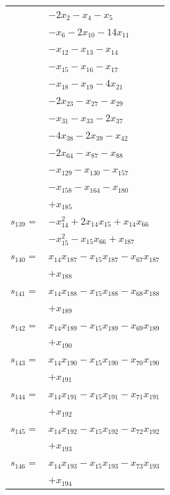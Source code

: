 \begin{longtable}{@{}r@{\;}l@{}}
 & \(\displaystyle -2x_{2} -x_{4} -x_{5}\) \\
 & \(\displaystyle -x_{6} -2x_{10} -14x_{11}\) \\
 & \(\displaystyle -x_{12} -x_{13} -x_{14}\) \\
 & \(\displaystyle -x_{15} -x_{16} -x_{17}\) \\
 & \(\displaystyle -x_{18} -x_{19} -4x_{21}\) \\
 & \(\displaystyle -2x_{23} -x_{27} -x_{29}\) \\
 & \(\displaystyle -x_{31} -x_{33} -2x_{37}\) \\
 & \(\displaystyle -4x_{38} -2x_{39} -x_{42}\) \\
 & \(\displaystyle -2x_{64} -x_{87} -x_{88}\) \\
 & \(\displaystyle -x_{129} -x_{130} -x_{157}\) \\
 & \(\displaystyle -x_{158} -x_{164} -x_{180}\) \\
 & \(\displaystyle +x_{185}\) \\[3pt]
\(s_{139}=\) & \(\displaystyle -x_{14}^{2} +2x_{14}x_{15} +x_{14}x_{66}\) \\
 & \(\displaystyle -x_{15}^{2} -x_{15}x_{66} +x_{187}\) \\[3pt]
\(s_{140}=\) & \(\displaystyle x_{14}x_{187} -x_{15}x_{187} -x_{67}x_{187}\) \\
 & \(\displaystyle +x_{188}\) \\[3pt]
\(s_{141}=\) & \(\displaystyle x_{14}x_{188} -x_{15}x_{188} -x_{68}x_{188}\) \\
 & \(\displaystyle +x_{189}\) \\[3pt]
\(s_{142}=\) & \(\displaystyle x_{14}x_{189} -x_{15}x_{189} -x_{69}x_{189}\) \\
 & \(\displaystyle +x_{190}\) \\[3pt]
\(s_{143}=\) & \(\displaystyle x_{14}x_{190} -x_{15}x_{190} -x_{70}x_{190}\) \\
 & \(\displaystyle +x_{191}\) \\[3pt]
\(s_{144}=\) & \(\displaystyle x_{14}x_{191} -x_{15}x_{191} -x_{71}x_{191}\) \\
 & \(\displaystyle +x_{192}\) \\[3pt]
\(s_{145}=\) & \(\displaystyle x_{14}x_{192} -x_{15}x_{192} -x_{72}x_{192}\) \\
 & \(\displaystyle +x_{193}\) \\[3pt]
\(s_{146}=\) & \(\displaystyle x_{14}x_{193} -x_{15}x_{193} -x_{73}x_{193}\) \\
 & \(\displaystyle +x_{194}\) \\[3pt]

\end{longtable}
